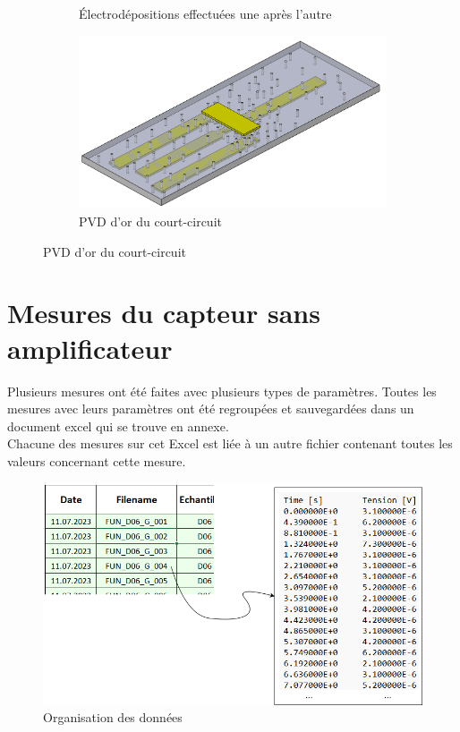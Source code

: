 \begin{itemize}
\begin{figure}[H]
\begin{subfigure}{0.45\textwidth}
                  \caption{Électrodépositions effectuées une après l'autre}
              \end{subfigure}
              \begin{subfigure}{0.45\textwidth}
                  \includegraphics[scale = 0.35]{assets/figures/Court_circuit_B.png}
                  \caption{PVD d'or du court-circuit}
              \end{subfigure}
          \end{figure}
\end{itemize}

\section{Mesures du capteur sans amplificateur}
Plusieurs mesures ont été faites avec plusieurs types de paramètres. Toutes les mesures avec leurs paramètres ont été regroupées et sauvegardées
dans un document excel qui se trouve en annexe.\\
Chacune des mesures sur cet Excel est liée à un autre fichier contenant toutes les valeurs concernant cette mesure.
\begin{figure}[H]
    \centering
    \includegraphics[scale = 0.4]{assets/figures/Data.png}
    \caption{Organisation des données}
    \label{fig:data_orga}
\end{figure}


